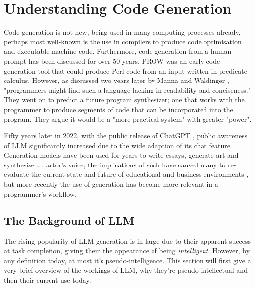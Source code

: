 \documentclass[manuscript,screen,review,sigconf]{acmart}
\begin{document}
\section{Understanding Code Generation}
Code generation is not new, being used in many computing processes already, perhaps most well-known is the use in compilers to produce code optimisation and executable machine code. Furthermore, code generation from a human prompt has been discussed for over 50 years. PROW \cite{PROW} was an early code generation tool that could produce Perl code from an input written in predicate calculus. However, as discussed two years later by Manna and Waldinger \cite{Program_Syn}, "programmers might find such a language lacking in readability and conciseness." They went on to predict a future program synthesizer; one that works with the programmer to produce segments of code that can be incorporated into the program. They argue it would be a "more practical system" with greater "power".

Fifty years later in 2022, with the public release of ChatGPT \cite{ChatRel}, public awareness of LLM significantly increased due to the wide adaption of its chat feature. Generation models have been used for years to write essays, generate art and synthesise an actor's voice, the implications of such have caused many to re-evaluate the current state and future of educational and business environments \cite{GPTBusinessImpact, GPTEducationImpact, ethicalImpact, LaborMarketImpact}, but more recently the use of generation has become more relevant in a programmer's workflow.

\subsection{The Background of LLM}
The rising popularity of LLM generation is in-large due to their apparent success at task completion, giving them the appearance of being \textit{intelligent}. However, by any definition today, at most it's pseudo-intelligence. This section will first give a very brief overview of the workings of LLM, why they're pseudo-intellectual and then their current use today.
\end{document}
